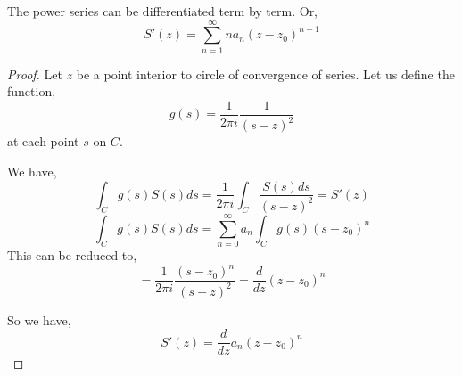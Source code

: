 \begin{theorem}
   The power series can be differentiated term by term. Or,  
   $$ S'(z) = \sum_{n=1}^{\infty} na_n (z - z_0)^{n-1} $$ 
\end{theorem}
\begin{proof}
   Let $z$ be a point interior to circle of convergence of series. Let us define the function, 
   $$ g(s) = \frac{1}{2\pi i} \frac{1}{(s - z)^2} $$ at each point $s$ on $C$.

   We have,  
   $$ \int_C g(s) S(s) ds = \frac{1}{2\pi i} \int_C \frac{S(s)ds}{(s - z)^2} = S'(z)$$
   $$ \int_C g(s) S(s) ds = \sum_{n=0}^{\infty} a_n \int_C g(s) (s - z_0)^{n}$$
   This can be reduced to, 
   $$ = \frac{1}{2 \pi i} \frac{(s- z_0)^{n}}{(s -z)^2} = \frac{d}{dz} (z - z_0)^{n} $$ 

   So we have, 
   $$ S'(z) = \frac{d}{dz} a_n (z - z_0)^{n} $$ 
\end{proof}

